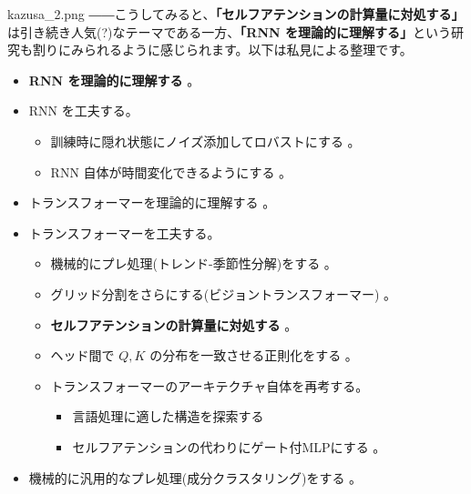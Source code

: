 \documentclass[b5paper,xelatex,ja=standard,10pt]{bxjsarticle}
\begin{document}
\begin{SERIFU}[colback=PaleIris, colbacktitle=PaleIris2]{kazusa_2.png}
――こうしてみると、\textbf{「セルフアテンションの計算量に対処する」}は引き続き人気(?)なテーマである一方、\textbf{「RNN を理論的に理解する」}という研究も割りにみられるように感じられます。以下は私見による整理です。
\begin{itemize}
  \item \textbf{RNN を理論的に理解する} \cite{AdelineFermanian2021} \cite{JimmySmith2021} \cite{LifuWang2021} \cite{AbhishekPanigrahi2021}。
  \item RNN を工夫する。
  \begin{itemize}
    \item 訓練時に隠れ状態にノイズ添加してロバストにする \cite{SoonHoeLim2021}。
    \item RNN 自体が時間変化できるようにする \cite{AstonZhang2021}。
  \end{itemize}

  \vspace{5pt}
  \item トランスフォーマーを理論的に理解する \cite{AliakbarPanahi2021} \cite{TrentonBricken2021}。
  \item トランスフォーマーを工夫する。
  \begin{itemize}
    \item 機械的にプレ処理(トレンド-季節性分解)をする \cite{HaixuWu2021}。
    \item グリッド分割をさらにする(ビジョントランスフォーマー) \cite{KaiHan2021}。
    \item \textbf{セルフアテンションの計算量に対処する} \cite{YifanChen2021} \cite{XuezheMa2021} \cite{SubhabrataDutta2021} \cite{SebastianJaszczur2021} \cite{BeidiChen2021} \cite{ChenZhu2021} \cite{HongyuRen2021} \cite{ShengjieLuo2021}。
    \item ヘッド間で $Q, K$ の分布を一致させる正則化をする \cite{ShujianZhang2021}。
    \item トランスフォーマーのアーキテクチャ自体を再考する。
    \begin{itemize}
      \item 言語処理に適した構造を探索する \cite{DavidSo2021}
      \item セルフアテンションの代わりにゲート付MLPにする \cite{HanxiaoLiu2021}。
    \end{itemize}
  \end{itemize}

  \vspace{5pt}
  \item 機械的に汎用的なプレ処理(成分クラスタリング)をする \cite{ZhiboZhu2021}。


\end{itemize}
\end{SERIFU}
\end{document}
